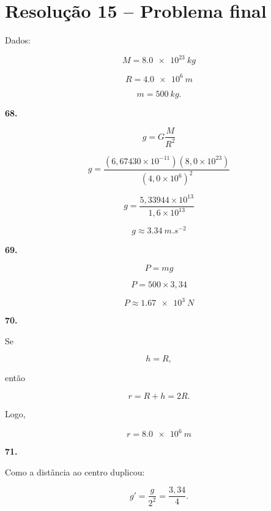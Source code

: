 \documentclass[11pt,a4paper]{article}
\begin{document}
	\section*{Resolução 15 -- Problema final}
	
	\begin{solucaobox}[Questões 68--74]
		
		Dados:
		
		\[
		M=\SI{8.0e23}{kg}
		\]
		
		\[
		R=\SI{4.0e6}{m}
		\]
		
		\[
		m=\SI{500}{kg}.
		\]
		
		\vspace{3mm}
		
		\textbf{68.}
		
		\[
		g=
		G\frac{M}{R^2}
		\]
		
		\[
		g=
		\frac{
			(6{,}67430\times10^{-11})
			(8{,}0\times10^{23})
		}{
			(4{,}0\times10^6)^2
		}
		\]
		
		\[
		g=
		\frac{
			5{,}33944\times10^{13}
		}{
			1{,}6\times10^{13}
		}
		\]
		
		\[
		\boxed{
			g\approx\SI{3.34}{m.s^{-2}}
		}
		\]
		
		\vspace{3mm}
		
		\textbf{69.}
		
		\[
		P=mg
		\]
		
		\[
		P=
		500\times3{,}34
		\]
		
		\[
		\boxed{
			P\approx\SI{1.67e3}{N}
		}
		\]
		
		\vspace{3mm}
		
		\textbf{70.}
		
		Se
		
		\[
		h=R,
		\]
		
		então
		
		\[
		r=R+h=2R.
		\]
		
		Logo,
		
		\[
		\boxed{
			r=\SI{8.0e6}{m}
		}
		\]
		
		\vspace{3mm}
		
		\textbf{71.}
		
		Como a distância ao centro duplicou:
		
		\[
		g'=
		\frac{g}{2^2}
		=
		\frac{3{,}34}{4}.
		\]
		

\end{solucaobox}
\end{document}
